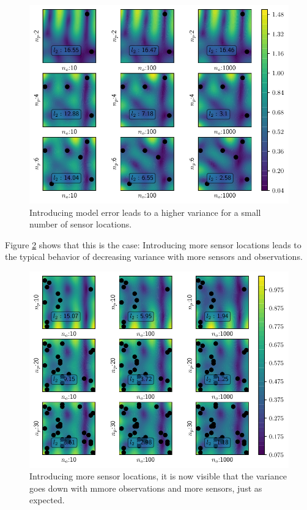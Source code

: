 \documentclass[%
  a4paper,oneside,%
  11pt,%
  smallchapters,
  style=printdev,
  extramargin,
  green,%
  rgb, <cmyk>
  ]{tubsbook}
\begin{document}
\begin{figure}[!ht]
\includegraphics[width=.9\textwidth]{../../Python/Results/2D/100procent_d/VarField_Posterior.pdf}
\centering
\caption{Introducing model error leads to a higher variance for a small number of sensor locations.}
\label{fig:100procent_d}
\end{figure}
Figure \ref{fig:100procent_d_more} shows that this is the case: Introducing more sensor locations leads to the typical behavior of decreasing variance with more sensors and observations.
\begin{figure}[!ht]
\includegraphics[width=.9\textwidth]{../../Python/Results/2D/100procent_d/VarField_PosteriorMoreSensors.pdf}
\centering
\caption{Introducing more sensor locations, it is now visible that the variance goes down with mmore observations and more sensors, just as expected.}
\label{fig:100procent_d_more}
\end{figure}
\end{document}
